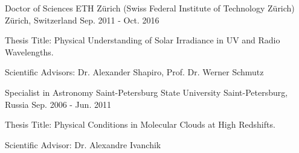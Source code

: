 

\begin{cventries}

  \cventry
    {Doctor of Sciences} %
    {ETH Z{\"u}rich (Swiss Federal Institute of Technology Z{\"u}rich)} %
    {Z{\"u}rich, Switzerland} %
    {Sep. 2011 - Oct. 2016} %
    {
      \begin{cvitems} %
        \item {Thesis Title: Physical Understanding of Solar Irradiance in UV and Radio Wavelengths.}
        \item {Scientific Advisors: Dr. Alexander Shapiro, Prof. Dr. Werner Schmutz}
      \end{cvitems}
    }

  \cventry
    {Specialist in Astronomy} %
    {Saint-Petersburg State University} %
    {Saint-Petersburg, Russia} %
    {Sep. 2006 - Jun. 2011} %
    {
      \begin{cvitems} %
        \item {Thesis Title: Physical Conditions in Molecular Clouds at High Redshifts.}
        \item {Scientific Advisor: Dr. Alexandre Ivanchik}
      \end{cvitems}
    }

\end{cventries}
